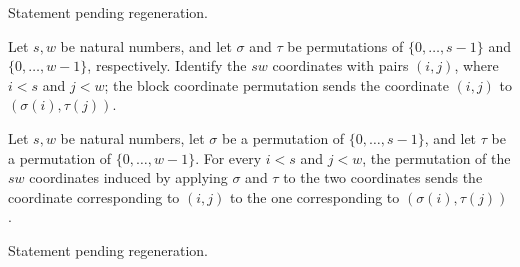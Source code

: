 \begin{theorem}
\label{FABL.tribes_unanimous}
\leanok
{}
Statement pending regeneration.
\end{theorem}

\begin{definition}
\label{FABL.blockCoordinatePermutation}
\leanok
Let $s,w$ be natural numbers, and let $\sigma$ and $\tau$ be permutations of
$\{0,\ldots,s-1\}$ and $\{0,\ldots,w-1\}$, respectively. Identify the $sw$ coordinates
with pairs $(i,j)$, where $i<s$ and $j<w$; the block coordinate permutation sends the
coordinate $(i,j)$ to $(\sigma(i),\tau(j))$.
\end{definition}

\begin{theorem}
\label{FABL.blockCoordinatePermutation_apply}
\leanok
{}
Let $s,w$ be natural numbers, let $\sigma$ be a permutation of $\{0,\ldots,s-1\}$, and
let $\tau$ be a permutation of $\{0,\ldots,w-1\}$. For every $i<s$ and $j<w$, the
permutation of the $sw$ coordinates induced by applying $\sigma$ and $\tau$ to the two
coordinates sends the coordinate corresponding to $(i,j)$ to the one corresponding to
$(\sigma(i),\tau(j))$.
\end{theorem}

\begin{theorem}
\label{FABL.tribes_blockCoordinatePermutation}
\leanok
{}
Statement pending regeneration.
\end{theorem}

